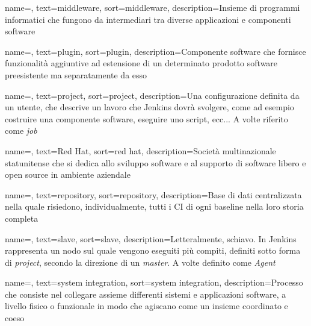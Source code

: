 {
    name=,
    text=middleware,
    sort=middleware,
    description={Insieme di programmi informatici che fungono da intermediari tra diverse applicazioni e componenti software}
}

{
    name=,
    text=plugin,
    sort=plugin,
    description={Componente software che fornisce funzionalità aggiuntive ad estensione di un determinato prodotto software preesistente ma separatamente da esso}
}

{
    name=,
    text=project,
    sort=project,
    description={Una configurazione definita da un utente, che descrive un lavoro che Jenkins dovrà svolgere, come ad esempio costruire una componente software, eseguire uno script, ecc... A volte riferito come \textit{job}}
}

{
    name=,
    text=Red Hat,
    sort=red hat,
    description={Società multinazionale statunitense che si dedica allo sviluppo software e al supporto di software libero e open source in ambiente aziendale}
}

{
    name=,
    text=repository,
    sort=repository,
    description={Base di dati centralizzata nella quale risiedono, individualmente, tutti i \gls{CI} di ogni \gls{baseline} nella loro storia completa}
}

{
    name=,
    text=slave,
    sort=slave,
    description={Letteralmente, schiavo. In Jenkins rappresenta un nodo sul quale vengono eseguiti più compiti, definiti sotto forma di \textit{project}, secondo la direzione di un \textit{master}. A volte definito come \textit{Agent}}
}

{
    name=,
    text=system integration,
    sort=system integration,
    description={Processo che consiste nel collegare assieme differenti sistemi e applicazioni software, a livello fisico o funzionale in modo che agiscano come un insieme coordinato e coeso}
}